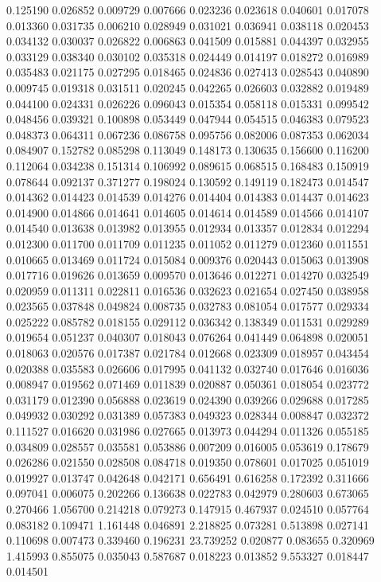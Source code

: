 0.125190
0.026852
0.009729
0.007666
0.023236
0.023618
0.040601
0.017078
0.013360
0.031735
0.006210
0.028949
0.031021
0.036941
0.038118
0.020453
0.034132
0.030037
0.026822
0.006863
0.041509
0.015881
0.044397
0.032955
0.033129
0.038340
0.030102
0.035318
0.024449
0.014197
0.018272
0.016989
0.035483
0.021175
0.027295
0.018465
0.024836
0.027413
0.028543
0.040890
0.009745
0.019318
0.031511
0.020245
0.042265
0.026603
0.032882
0.019489
0.044100
0.024331
0.026226
0.096043
0.015354
0.058118
0.015331
0.099542
0.048456
0.039321
0.100898
0.053449
0.047944
0.054515
0.046383
0.079523
0.048373
0.064311
0.067236
0.086758
0.095756
0.082006
0.087353
0.062034
0.084907
0.152782
0.085298
0.113049
0.148173
0.130635
0.156600
0.116200
0.112064
0.034238
0.151314
0.106992
0.089615
0.068515
0.168483
0.150919
0.078644
0.092137
0.371277
0.198024
0.130592
0.149119
0.182473
0.014547
0.014362
0.014423
0.014539
0.014276
0.014404
0.014383
0.014437
0.014623
0.014900
0.014866
0.014641
0.014605
0.014614
0.014589
0.014566
0.014107
0.014540
0.013638
0.013982
0.013955
0.012934
0.013357
0.012834
0.012294
0.012300
0.011700
0.011709
0.011235
0.011052
0.011279
0.012360
0.011551
0.010665
0.013469
0.011724
0.015084
0.009376
0.020443
0.015063
0.013908
0.017716
0.019626
0.013659
0.009570
0.013646
0.012271
0.014270
0.032549
0.020959
0.011311
0.022811
0.016536
0.032623
0.021654
0.027450
0.038958
0.023565
0.037848
0.049824
0.008735
0.032783
0.081054
0.017577
0.029334
0.025222
0.085782
0.018155
0.029112
0.036342
0.138349
0.011531
0.029289
0.019654
0.051237
0.040307
0.018043
0.076264
0.041449
0.064898
0.020051
0.018063
0.020576
0.017387
0.021784
0.012668
0.023309
0.018957
0.043454
0.020388
0.035583
0.026606
0.017995
0.041132
0.032740
0.017646
0.016036
0.008947
0.019562
0.071469
0.011839
0.020887
0.050361
0.018054
0.023772
0.031179
0.012390
0.056888
0.023619
0.024390
0.039266
0.029688
0.017285
0.049932
0.030292
0.031389
0.057383
0.049323
0.028344
0.008847
0.032372
0.111527
0.016620
0.031986
0.027665
0.013973
0.044294
0.011326
0.055185
0.034809
0.028557
0.035581
0.053886
0.007209
0.016005
0.053619
0.178679
0.026286
0.021550
0.028508
0.084718
0.019350
0.078601
0.017025
0.051019
0.019927
0.013747
0.042648
0.042171
0.656491
0.616258
0.172392
0.311666
0.097041
0.006075
0.202266
0.136638
0.022783
0.042979
0.280603
0.673065
0.270466
1.056700
0.214218
0.079273
0.147915
0.467937
0.024510
0.057764
0.083182
0.109471
1.161448
0.046891
2.218825
0.073281
0.513898
0.027141
0.110698
0.007473
0.339460
0.196231
23.739252
0.020877
0.083655
0.320969
1.415993
0.855075
0.035043
0.587687
0.018223
0.013852
9.553327
0.018447
0.014501
